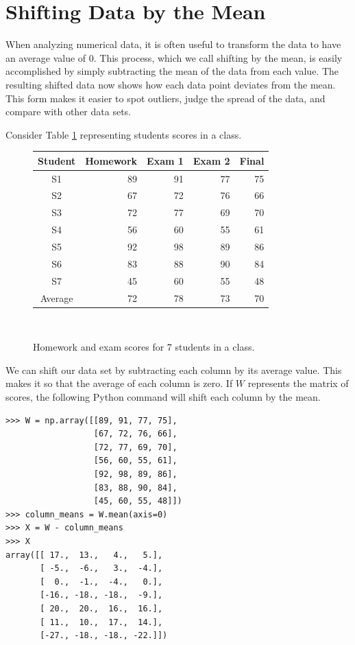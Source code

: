 \label{lab:Stats1}



\section*{Shifting Data by the Mean}
When analyzing numerical data, it is often useful to transform the data to have an average value of 0.
This process, which we call shifting by the mean, 
is easily accomplished by simply subtracting the mean of the data from each value. 
The resulting shifted data now shows how each data point deviates from the mean.
This form makes it easier to spot outliers, judge the spread of the data, and compare with other data sets.

Consider Table \ref{tab:data} representing students scores in a class.\\

\begin{figure}
\begin{center}
\begin{tabular}{|c|r|r|r|r|}
	\hline
Student & Homework & Exam 1  & Exam 2 & Final \\
\hline
S1  & 89 & 91 & 77 & 75 \\
S2  & 67 & 72 & 76 & 66 \\
S3  & 72 & 77 & 69 & 70 \\
S4  & 56 & 60 & 55 & 61 \\
S5  & 92 & 98 & 89 & 86 \\
S6  & 83 & 88 & 90 & 84 \\
S7  & 45 & 60 & 55 & 48 \\
\hline
Average  & 72 & 78 & 73 & 70\\
\hline
\end{tabular}\\
\end{center}
\caption{Homework and exam scores for 7 students in a class.}
\label{tab:data}
\end{figure}

We can shift our data set by subtracting each column by its average value.  
This makes it so that the average of each column is zero.  
If $W$ represents the matrix of scores, the following Python command will shift each column by the mean.
\begin{lstlisting}
>>> W = np.array([[89, 91, 77, 75],
                  [67, 72, 76, 66],
                  [72, 77, 69, 70],
                  [56, 60, 55, 61],
                  [92, 98, 89, 86],
                  [83, 88, 90, 84],
                  [45, 60, 55, 48]])
>>> column_means = W.mean(axis=0)
>>> X = W - column_means
>>> X
array([[ 17.,  13.,   4.,   5.],
       [ -5.,  -6.,   3.,  -4.],
       [  0.,  -1.,  -4.,   0.],
       [-16., -18., -18.,  -9.],
       [ 20.,  20.,  16.,  16.],
       [ 11.,  10.,  17.,  14.],
       [-27., -18., -18., -22.]])
\end{lstlisting}

